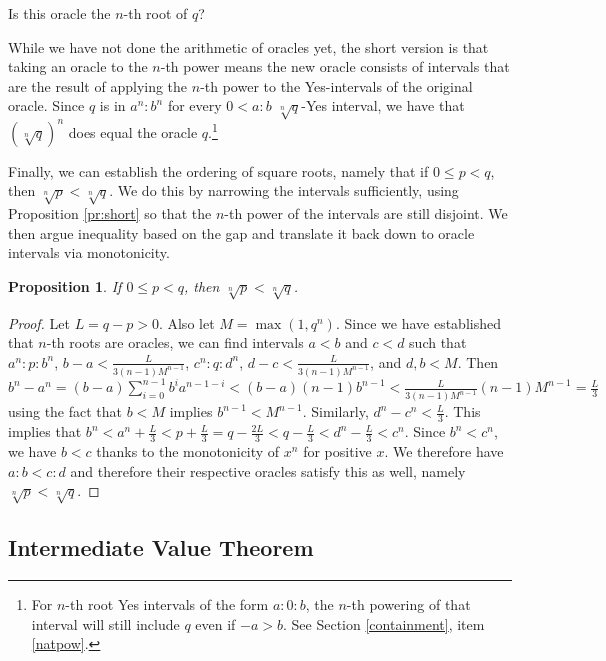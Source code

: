 \documentclass[12pt]{article}
\newtheorem{proposition}{Proposition}[subsection]
\begin{document}
Is this oracle the $n$-th root of $q$?

While we have not done the arithmetic of oracles yet, the short version is that taking an oracle to the $n$-th power means the new oracle consists of intervals that are the result of applying the $n$-th power to the Yes-intervals of the original oracle. Since $q$ is in $a^n:b^n$ for every $0<a:b$ $\sqrt[n]{q}$-Yes interval, we have that $(\sqrt[n]{q})^n$ does equal the oracle $q$.\footnote{For $n$-th root Yes \-intervals of the form $a:0:b$, the $n$-th powering of that interval will still include $q$ even if $-a>b$. See Section \ref{containment}, item \ref{natpow}.} 

Finally, we can establish the ordering of square roots, namely that if $0 \leq p<q$, then $\sqrt[n]{p} < \sqrt[n]{q}$. We do this by narrowing the intervals sufficiently, using Proposition \ref{pr:short} so that the $n$-th power of the intervals are still disjoint. We then argue inequality based on the gap and translate it back down to oracle intervals via monotonicity. 

\begin{proposition}
    If $0 \leq p <q$, then $\sqrt[n]{p} < \sqrt[n]{q}$.
\end{proposition}

\begin{proof}
    Let $L = q-p > 0$. Also let $M = \max(1, q^n)$.  Since we have established that $n$-th roots are oracles, we can find intervals $a\lt b$ and $c \lt d$ such that $a^n:p:b^n$, $b-a < \frac{L}{3(n-1)M^{n-1}}$, $c^n:q:d^n$, $d-c < \frac{L}{3(n-1)M^{n-1}}$,  and $d, b < M$.  Then $b^n-a^n = (b-a) \sum_{i=0}^{n-1} b^i a^{n-1-i} < (b-a)(n-1) b^{n-1} < \frac{L}{3(n-1)M^{n-1}} (n-1) M^{n-1} = \frac{L}{3}$ using the fact that $b<M$ implies $b^{n-1} < M^{n-1}$. Similarly, $d^n-c^n < \frac{L}{3}$. This implies that $b^n < a^n + \frac{L}{3}  < p + \frac{L}{3}  = q - \frac{2 L }{3} < q -  \frac{L}{3} < d^n - \frac{L}{3} < c^n$. Since $b^n < c^n$, we have $b < c$ thanks to the monotonicity of $x^n$ for positive $x$. We therefore have $a:b < c:d$ and therefore their respective oracles satisfy this as well, namely $\sqrt[n]{p} < \sqrt[n]{q}$.
\end{proof}



\subsection{Intermediate Value Theorem}\label{sec:ivt}
\end{document}
